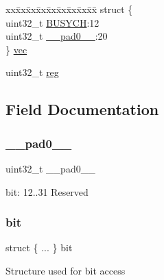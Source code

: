 \begin{DoxyCompactItemize}
\begin{tabbing}
\end{tabbing}\item 
\begin{tabbing}
xx\=xx\=xx\=xx\=xx\=xx\=xx\=xx\=xx\=\kill
struct \{\\
\>uint32\_t \mbox{\hyperlink{union_d_m_a_c___b_u_s_y_c_h___type_a4f1c50db7a95376a6d6ac4639eb4db1b}{BUSYCH}}:12\\
\>uint32\_t \mbox{\hyperlink{union_d_m_a_c___b_u_s_y_c_h___type_a3e57c2ef1c3ffb36722f000cc1156824}{\_\_pad0\_\_}}:20\\
\} \mbox{\hyperlink{union_d_m_a_c___b_u_s_y_c_h___type_a292006aa3c689bb7cc5750f46acc753c}{vec}}\\

\end{tabbing}\item 
uint32\+\_\+t \mbox{\hyperlink{union_d_m_a_c___b_u_s_y_c_h___type_a6b91636401516a477989a336376d7b40}{reg}}
\end{DoxyCompactItemize}


\subsection{Field Documentation}
\mbox{\label{union_d_m_a_c___b_u_s_y_c_h___type_a3e57c2ef1c3ffb36722f000cc1156824}} 
\subsubsection{\texorpdfstring{\_\_pad0\_\_}{\_\_pad0\_\_}}
{\footnotesize\ttfamily uint32\+\_\+t \+\_\+\+\_\+pad0\+\_\+\+\_\+}

bit\+: 12..31 Reserved \mbox{\label{union_d_m_a_c___b_u_s_y_c_h___type_a00602e1998342abd46227ecb553b5fce}} 
\subsubsection{\texorpdfstring{bit}{bit}}
{\footnotesize\ttfamily struct \{ ... \}   bit}

Structure used for bit access \mbox{\label{union_d_m_a_c___b_u_s_y_c_h___type_a4f1c50db7a95376a6d6ac4639eb4db1b}} 
